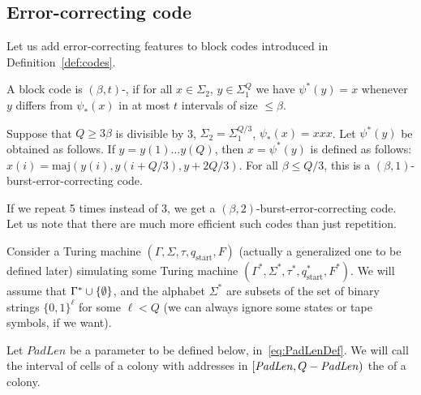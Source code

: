 \documentclass[12pt]{memoir}
\renewcommand{\le}{\leq}
\renewcommand{\ge}{\geq}
\newcommand{\fld}[1]{\ensuremath{\textit{#1\/}}}
\newcommand{\maj}{\mathrm{maj}}
\def\B{B}
\newcommand{\Tu}{T}
\newcommand{\Tus}{T^{*}}
\newcommand{\cDir}{\fld{cDir}}
\newcommand{\NonAdj}{\fld{NonAdj}}
\newcommand{\PadLen}{\mathit{PadLen}}
\newcommand{\start}{\mathrm{start}}
\begin{document}
\subsection{Error-correcting code}\label{sec:coding}

Let us add error-correcting features to block codes introduced in
Definition~\ref{def:codes}.

\begin{sloppypar}
\begin{definition}\label{def:err-code}
A block code is \( (\beta,t) \)-,
if for all \( x\in\Sigma_{2} \), \( y\in\Sigma_{1}^{Q} \) we
have \( \psi^{*}(y)=x \) whenever \( y \) differs from
\( \psi_{*}(x) \) in at most \( t \) intervals of size \( \le\beta \).
\end{definition}
  \end{sloppypar}

\begin{example}\label{xmp:tripling}
  Suppose that \( Q\ge 3\beta \) is divisible by 3,
  \( \Sigma_{2}=\Sigma_{1}^{Q/3} \), \( \psi_{*}(x)=xxx \).
  Let \( \psi^{*}(y) \) be obtained as follows.
  If \( y=y(1)\dots y(Q) \), then \( x=\psi^{*}(y) \) is defined as follows:
    \( x(i)=\maj(y(i),y(i+Q/3),y+2Q/3) \).
    For all \( \beta\le Q/3 \), this is a
    \( (\beta,1) \)-burst-error-correcting code.

    If we repeat 5 times instead of 3, we get a \( (\beta,2) \)-burst-error-correcting
    code.
    Let us note that there are much more efficient such codes than just repetition.
 \end{example}

Consider a Turing machine 
\( (\Gamma, \Sigma,\tau, q_{\start},F) \) (actually a generalized one to be defined later)
simulating some Turing machine \( (\Gamma^{*}, \Sigma^{*},\tau^{*}, q^{*}_{\start},F^{*}) \).
We will assume that \( \Gamma^*\cup\mathopen\{\emptyset\mathclose\} \),
and the alphabet \( \Sigma^* \) are subsets of the set of  binary strings
\( \{0,1\}^{\ell} \) for some \( \ell<Q \) (we can always ignore some states or tape
symbols, if we want).

\begin{definition}[Interior]\label{def:interior}
Let \( \PadLen \) be a parameter to be defined below, in~\eqref{eq:PadLenDef}.
We will call the interval of cells of a colony with addresses
in \( \lint{\PadLen}{Q-\PadLen} \) the  of a colony.
\end{definition}
\end{document}
